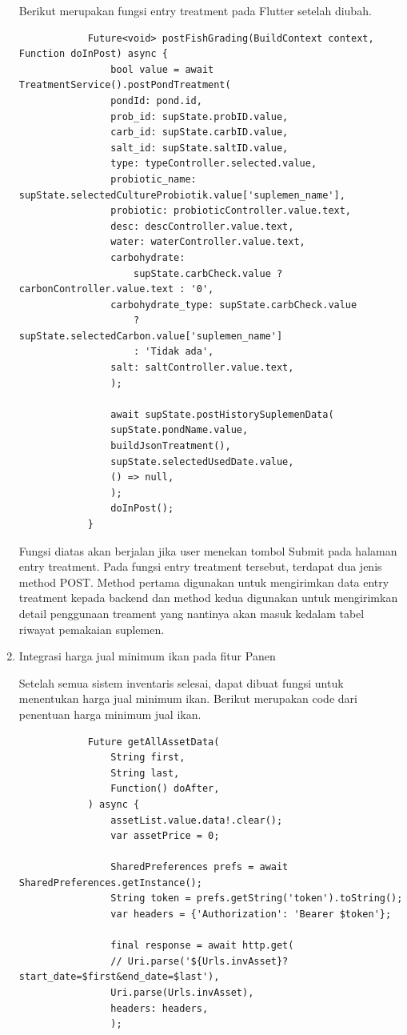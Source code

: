\begin{spacing}{1.5}
\begin{enumerate}
		Berikut merupakan fungsi entry treatment pada Flutter setelah diubah.

		\begin{lstlisting}
			Future<void> postFishGrading(BuildContext context, Function doInPost) async {
				bool value = await TreatmentService().postPondTreatment(
				pondId: pond.id,
				prob_id: supState.probID.value,
				carb_id: supState.carbID.value,
				salt_id: supState.saltID.value,
				type: typeController.selected.value,
				probiotic_name: supState.selectedCultureProbiotik.value['suplemen_name'],
				probiotic: probioticController.value.text,
				desc: descController.value.text,
				water: waterController.value.text,
				carbohydrate:
					supState.carbCheck.value ? carbonController.value.text : '0',
				carbohydrate_type: supState.carbCheck.value
					? supState.selectedCarbon.value['suplemen_name']
					: 'Tidak ada',
				salt: saltController.value.text,
				);

				await supState.postHistorySuplemenData(
				supState.pondName.value,
				buildJsonTreatment(),
				supState.selectedUsedDate.value,
				() => null,
				);
				doInPost();
			}
		\end{lstlisting}

		Fungsi diatas akan berjalan jika user menekan tombol Submit pada halaman entry treatment. Pada fungsi entry treatment tersebut, terdapat dua jenis method POST. Method pertama digunakan untuk mengirimkan data entry treatment kepada backend dan method kedua digunakan untuk mengirimkan detail penggunaan treament yang nantinya akan masuk kedalam tabel riwayat pemakaian suplemen.

		\item Integrasi harga jual minimum ikan pada fitur Panen
		
		Setelah semua sistem inventaris selesai, dapat dibuat fungsi untuk menentukan harga jual minimum ikan. Berikut merupakan code dari penentuan harga minimum jual ikan.

		\begin{lstlisting}
			Future getAllAssetData(
				String first,
				String last,
				Function() doAfter,
			) async {
				assetList.value.data!.clear();
				var assetPrice = 0;

				SharedPreferences prefs = await SharedPreferences.getInstance();
				String token = prefs.getString('token').toString();
				var headers = {'Authorization': 'Bearer $token'};

				final response = await http.get(
				// Uri.parse('${Urls.invAsset}?start_date=$first&end_date=$last'),
				Uri.parse(Urls.invAsset),
				headers: headers,
				);


\end{lstlisting}
\end{enumerate}
\end{spacing}
